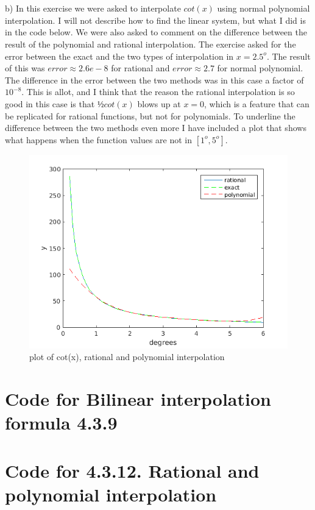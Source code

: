 \documentclass[11pt,a4paper]{report}
\begin{document}
\\
\\
b) In this exercise we were asked to interpolate $cot(x)$ using normal polynomial interpolation. I will not describe how to find the linear system, but what I did is in the code below. We were also asked to comment on the difference between the result of the polynomial and rational interpolation. The exercise asked for the error between the exact and the two types of interpolation in $x=2.5^o$. The result of this was $error\approx2.6e-8 $ for rational and $error\approx2.7 $ for normal polynomial. The difference in the error between the two methods was in this case a factor of $10^{-8}$. This is allot, and I think that the reason the rational interpolation is so good in this case is that $½cot(x)$ blows up at $x=0$, which is a feature that can be replicated for rational functions, but not for polynomials. To underline the difference between the two methods even more I have included a plot that shows what happens when the function values are not in $[1^o,5^o]$.

\begin{figure}
  \includegraphics[width=\linewidth]{oblig2_rational.png}
  \caption{plot of cot(x), rational and polynomial interpolation}
  \label{Fig 1}
\end{figure}

\section*{Code for Bilinear interpolation formula 4.3.9}



\section*{Code for 4.3.12. Rational and polynomial interpolation}

\end{document}
